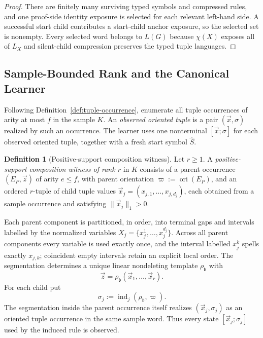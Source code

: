 \documentclass[11pt,a4paper]{article}
\numberwithin{equation}{section}
\theoremstyle{plain}
\theoremstyle{definition}
\newtheorem{definition}[theorem]{Definition}
\theoremstyle{remark}
\newcommand{\tuple}[1]{\vec{#1}}
\begin{document}
\begin{proof}
There are finitely many surviving typed symbols and compressed rules, and one
proof-side identity exposure is selected for each relevant left-hand side.
A successful start child contributes a start-child anchor exposure, so the selected set is nonempty.  Every
selected word belongs to \(L(G)\) because \(\chi(X)\) exposes all of \(L_X\)
and silent-child compression preserves the typed tuple languages.
\end{proof}

\subsection{Sample-Bounded Rank and the Canonical Learner}

Following Definition~\ref{def:tuple-occurrence}, enumerate all tuple
occurrences of arity at most \(f\) in the sample \(K\).  An
\emph{observed oriented tuple} is a pair \((\tuple x,\sigma)\) realized by
such an occurrence.  The learner uses one nonterminal
\([\tuple x;\sigma]\) for each observed oriented tuple, together with a fresh
start symbol \(\widehat S\).

\begin{definition}[Positive-support composition witness]
\label{def:composition-witness}
Let \(r\ge1\).  A \emph{positive-support composition witness of rank \(r\)}
in \(K\) consists of a parent occurrence \((E_P,\tuple z)\) of arity
\(e\le f\), with parent orientation
\(\varpi:=\operatorname{ori}(E_P)\), and an ordered \(r\)-tuple of child tuple
values \(\tuple x_j=(x_{j,1},\ldots,x_{j,d_j})\), each obtained from a sample
occurrence and satisfying \(\|\tuple x_j\|_1>0\).

Each parent component is partitioned, in order, into terminal gaps and
intervals labelled by the normalized variables
\(X_j=\{x_j^1,\ldots,x_j^{d_j}\}\).  Across all parent components every
variable is used exactly once, and the interval labelled \(x_j^k\) spells
exactly \(x_{j,k}\); coincident empty intervals retain an explicit local order.
The segmentation determines a unique linear nondeleting template
\(\rho_{\mathfrak b}\) with
\[
  \tuple z=\rho_{\mathfrak b}(\tuple x_1,\ldots,\tuple x_r).
\]
For each child put
\[
  \sigma_j:=\operatorname{ind}_j(\rho_{\mathfrak b},\varpi).
\]
The segmentation inside the parent occurrence itself realizes
\((\tuple x_j,\sigma_j)\) as an oriented tuple occurrence in the same sample
word.  Thus every state \([\tuple x_j;\sigma_j]\) used by the induced rule is
observed.
\end{definition}
\end{document}
